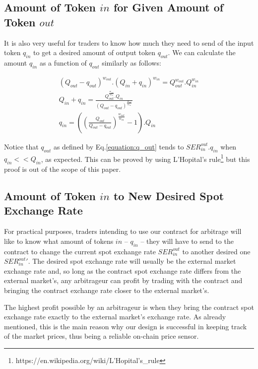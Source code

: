 \documentclass[11pt]{amsart}
\begin{document}
\subsection{Amount of Token $in$ for Given Amount of Token $out$}
It is also very useful for traders to know how much they need to send of the input token $q_{in}$ to get a desired amount of output token $q_{out}$. We can calculate the amount $q_{in}$ as a function of $q_{out}$ similarly as follows:

\begin{equation}
\begin{gathered}
(Q_{out}-q_{out})^{w_{out}}.(Q_{in}+q_{in})^{w_{in}} = Q_{out}^{w_{out}}.Q_{in}^{w_{in}} \\
Q_{in}+q_{in} = \frac{Q_{out}^{\frac{w_{out}}{w_{in}}}.Q_{in}}{(Q_{out}-q_{out})^{\frac{w_{out}}{w_{in}}}}\\
q_{in} = \left(\left(\frac{Q_{out}}{Q_{out}-q_{out}}\right)^{\frac{w_{out}}{w_{in}}}-1\right).Q_{in}
\end{gathered}
\end{equation}

Notice that $q_{out}$ as defined by Eq.\ref{equation:q_out} tends to $SER^{out}_{in}.q_{in}$ when $q_{in} << Q_{in}$, as expected. This can be proved by using L'Hopital's rule\footnote{https://en.wikipedia.org/wiki/L'Hopital's\_rule} but this proof is out of the scope of this paper.

\subsection{Amount of Token $in$ to New Desired Spot Exchange Rate}
For practical purposes, traders intending to use our contract for arbitrage will like to know what amount of tokens $in$ -- $q_{in}$ -- they will have to send to the contract to change the current spot exchange rate $SER^{out}_{in}$ to another desired one $SER^{out}_{in}'$. The desired spot exchange rate will usually be the external market exchange rate and, so long as the contract spot exchange rate differs from the external market's, any arbitrageur can profit by trading with the contract and bringing the contract exchange rate closer to the external market's. 

The highest profit possible by an arbitrageur is when they bring the contract spot exchange rate exactly to the external market's exchange rate. As already mentioned, this is the main reason why our design is successful in keeping track of the market prices, thus being a reliable on-chain price sensor.
\end{document}
